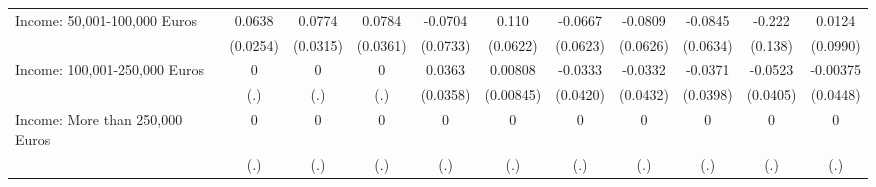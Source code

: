 {\begin{tabular}{l*{10}{c}}
Income: 50,001-100,000 Euros&      0.0638\sym{*}  &      0.0774\sym{*}  &      0.0784\sym{*}  &     -0.0704         &       0.110         &     -0.0667         &     -0.0809         &     -0.0845         &      -0.222         &      0.0124         \\
            &    (0.0254)         &    (0.0315)         &    (0.0361)         &    (0.0733)         &    (0.0622)         &    (0.0623)         &    (0.0626)         &    (0.0634)         &     (0.138)         &    (0.0990)         \\
\addlinespace
Income: 100,001-250,000 Euros&           0         &           0         &           0         &      0.0363         &     0.00808         &     -0.0333         &     -0.0332         &     -0.0371         &     -0.0523         &    -0.00375         \\
            &         (.)         &         (.)         &         (.)         &    (0.0358)         &   (0.00845)         &    (0.0420)         &    (0.0432)         &    (0.0398)         &    (0.0405)         &    (0.0448)         \\
\addlinespace
Income: More than 250,000 Euros&           0         &           0         &           0         &           0         &           0         &           0         &           0         &           0         &           0         &           0         \\
            &         (.)         &         (.)         &         (.)         &         (.)         &         (.)         &         (.)         &         (.)         &         (.)         &         (.)         &         (.)         \\
\bottomrule
\end{tabular}
}

